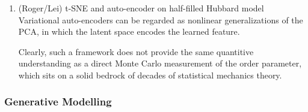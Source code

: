 \documentclass[aps,prb,floatfix,amsmath,amssymb,amsfonts,10pt,floatfix,longbibliography]{revtex4-1}
\begin{document}
\begin{enumerate}
\item (Roger/Lei) t-SNE and auto-encoder on half-filled Hubbard model \cite{Chng2018}
Variational auto-encoders can be regarded as nonlinear generalizations of the PCA, in which the latent space encodes the learned feature. 

Clearly, such a framework does not provide the same quantitive understanding as a direct
Monte Carlo measurement of the order parameter, which sits on a solid bedrock of decades
of statistical mechanics theory.
\end{enumerate}


\subsubsection{Generative Modelling}
\label{sec:WF}
\end{document}
